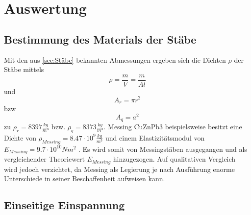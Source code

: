 \section{Auswertung}
\label{sec:Auswertung}
\subsection{Bestimmung des Materials der Stäbe}
\label{sec:Material}
Mit den aus \ref{sec:Stäbe} bekannten Abmessungen ergeben sich die Dichten $\rho$ der Stäbe mittels
\begin{equation}
  \rho = \frac{m}{V} = \frac{m}{Al}
\end{equation}
und
\begin{equation}
  A_r = \pi r^2
\end{equation}
bzw
\begin{equation}
  A_q = a^2
\end{equation}
zu $\rho_r =8397 \frac{kg}{m^3}$  bzw. $\rho_q = 8373 \frac{kg}{m^3}$. Messing CuZnPb3 beispielsweise besitzt eine Dichte von $\rho_{Messing} = 8.47 \cdot 10^9 \frac{kg}{m^3}$ und einem Elastizitätsmodul von $E_{Messing} = 9.7 \cdot 10^10 {N}{m^2}$ \cite{DKI}. Es wird somit von Messingstäben ausgegangen und als vergleichender Theoriewert $E_{Messing}$ hinzugezogen. Auf qualitativen Vergleich wird jedoch verzichtet, da Messing als Legierung je nach Ausführung enorme Unterschiede in seiner Beschaffenheit aufweisen kann.
\subsection{Einseitige Einspannung}
\label{sec:Einseitig}


